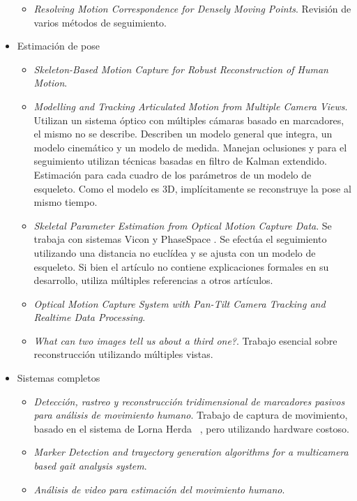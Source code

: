 \begin{itemize}
\begin{itemize}
		\item \emph{Resolving Motion Correspondence for Densely Moving Points}\cite{survey_tracking}. Revisión de varios métodos de seguimiento.
	\end{itemize}
	\item Estimación de pose
	\begin{itemize}
		\item \emph{Skeleton-Based Motion Capture for Robust Reconstruction of Human Motion}\cite{herda}. 
		\item \emph{Modelling and Tracking Articulated Motion from Multiple Camera Views}\cite{ringer2000modelling}.
		Utilizan un sistema óptico con múltiples cámaras basado en marcadores, el mismo no se describe. Describen un modelo general que integra, un modelo cinemático y un modelo de medida. Manejan oclusiones y para el seguimiento utilizan técnicas basadas en filtro de Kalman extendido. Estimación para cada cuadro de los parámetros de un modelo de esqueleto. Como el modelo es 3D, implícitamente se reconstruye la pose al mismo tiempo.        
		\item \emph{Skeletal Parameter Estimation from Optical Motion Capture Data}\cite{kirk2005skeletal}.
		Se trabaja con sistemas Vicon \cite{vicon} y PhaseSpace \cite{phasespace}. Se efectúa el seguimiento utilizando una distancia no euclídea y se ajusta con un modelo de esqueleto. Si bien el artículo no contiene explicaciones formales en su desarrollo, utiliza múltiples referencias a otros artículos.
		\item \emph{Optical Motion Capture System with Pan-Tilt Camera Tracking and  Realtime Data Processing}\cite{kurihara2002optical}.
		\item \emph{What can two images tell us about a third one?}\cite{faugueras}. Trabajo esencial sobre reconstrucción utilizando múltiples vistas.
	\end{itemize}
	\item Sistemas completos
	\begin{itemize}
		\item \emph{Detección, rastreo y reconstrucción tridimensional de marcadores pasivos para análisis de movimiento humano}\cite{colombianos}.	Trabajo de captura de movimiento, basado en el sistema de Lorna Herda ~\cite{herda}, pero utilizando hardware costoso.
		\item \emph{Marker Detection and trayectory generation algorithms for a multicamera based gait analysis system}\cite{shafiq2001marker}.
		\item \emph{Análisis de video para estimación del movimiento humano}\cite{martinez2009analisis}.
	\end{itemize}
\end{itemize}

